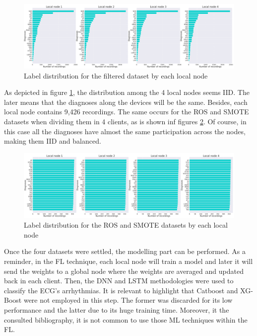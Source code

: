 \begin{figure}[H]
\centering
\includegraphics[scale=0.4]{img/fl_label_distro_filtered.png}
\caption{Label distribution for the filtered dataset by each local node}
\label{fig:fl_label_distro_filtered}
\end{figure}

As depicted in figure \ref{fig:fl_label_distro_filtered}, the distribution among the 4 local nodes seems IID. The later means that the diagnoses along the devices will be the same. Besides, each local node contains 9,426 recordings. The same occurs for the ROS and SMOTE datasets when dividing them in 4 clients, as is shown inf figures \ref{fig:fl_label_distro_filtered_ROS_SMT}. Of course, in this case all the diagnoses have almost the same participation across the nodes, making them IID and balanced.

\begin{figure}[H]
\centering
\includegraphics[scale=0.4]{img/fl_label_distro_filtered_ROS_SMT.png}
\caption{Label distribution for the ROS and SMOTE datasets by each local node}
\label{fig:fl_label_distro_filtered_ROS_SMT}
\end{figure}

Once the four datasets were settled, the modelling part can be performed. As a reminder, in the FL technique, each local node will train a model and later it will send the weights to a global node where the weights are averaged and updated back in each client. Then, the DNN and LSTM methodologies were used to classify the ECG's arrhythmias. It is relevant to highlight that Catboost and XG-Boost were not employed in this step. The former was discarded for its low performance and the latter due to its huge training time. Moreover, it the consulted bibliography, it is not common to use those ML techniques within the FL.

